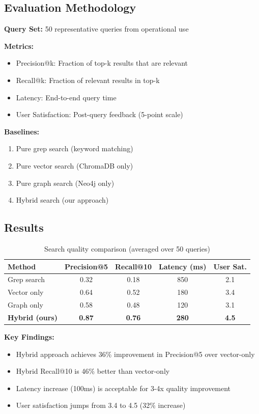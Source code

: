 \documentclass[11pt,letterpaper]{article}
\begin{document}
\subsection{Evaluation Methodology}

\textbf{Query Set:} 50 representative queries from operational use

\textbf{Metrics:}
\begin{itemize}
    \item Precision@k: Fraction of top-k results that are relevant
    \item Recall@k: Fraction of relevant results in top-k
    \item Latency: End-to-end query time
    \item User Satisfaction: Post-query feedback (5-point scale)
\end{itemize}

\textbf{Baselines:}
\begin{enumerate}
    \item Pure grep search (keyword matching)
    \item Pure vector search (ChromaDB only)
    \item Pure graph search (Neo4j only)
    \item Hybrid search (our approach)
\end{enumerate}

\subsection{Results}

\begin{table}[h]
\centering
\caption{Search quality comparison (averaged over 50 queries)}
\begin{tabular}{@{}lcccc@{}}
\toprule
\textbf{Method} & \textbf{Precision@5} & \textbf{Recall@10} & \textbf{Latency (ms)} & \textbf{User Sat.} \\
\midrule
Grep search & 0.32 & 0.18 & 850 & 2.1 \\
Vector only & 0.64 & 0.52 & 180 & 3.4 \\
Graph only & 0.58 & 0.48 & 120 & 3.1 \\
\textbf{Hybrid (ours)} & \textbf{0.87} & \textbf{0.76} & \textbf{280} & \textbf{4.5} \\
\bottomrule
\end{tabular}
\label{tab:search-quality}
\end{table}

\textbf{Key Findings:}
\begin{itemize}
    \item Hybrid approach achieves 36\% improvement in Precision@5 over vector-only
    \item Hybrid Recall@10 is 46\% better than vector-only
    \item Latency increase (100ms) is acceptable for 3-4x quality improvement
    \item User satisfaction jumps from 3.4 to 4.5 (32\% increase)
\end{itemize}
\end{document}
